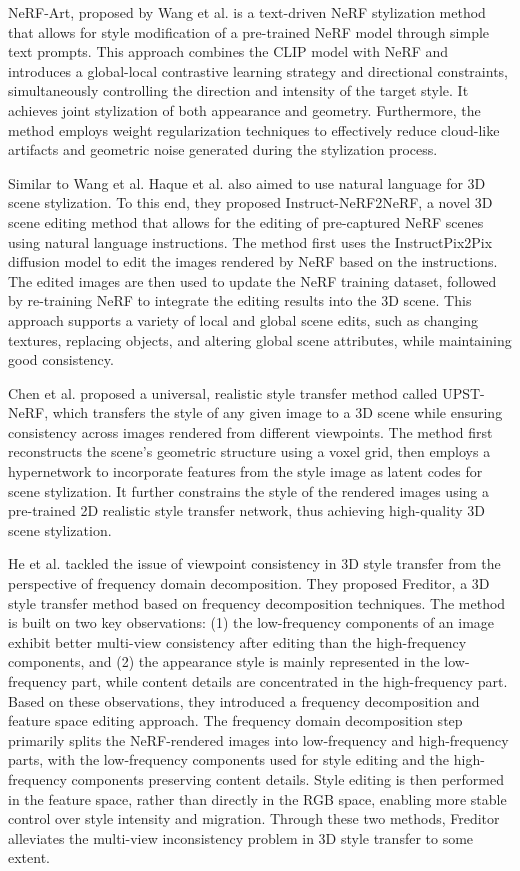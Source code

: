\documentclass[preprint,12pt]{elsarticle}
\begin{document}
NeRF-Art, proposed by Wang et al.\citep{94wang2023nerf}  is a text-driven NeRF stylization method that allows for style modification of a pre-trained NeRF model through simple text prompts. This approach combines the CLIP model with NeRF and introduces a global-local contrastive learning strategy and directional constraints, simultaneously controlling the direction and intensity of the target style. It achieves joint stylization of both appearance and geometry. Furthermore, the method employs weight regularization techniques to effectively reduce cloud-like artifacts and geometric noise generated during the stylization process.

Similar to Wang et al.\citep{94wang2023nerf}  Haque et al.\citep{95haque2023instruct} also aimed to use natural language for 3D scene stylization. To this end, they proposed Instruct-NeRF2NeRF, a novel 3D scene editing method that allows for the editing of pre-captured NeRF scenes using natural language instructions. The method first uses the InstructPix2Pix diffusion model to edit the images rendered by NeRF based on the instructions. The edited images are then used to update the NeRF training dataset, followed by re-training NeRF to integrate the editing results into the 3D scene. This approach supports a variety of local and global scene edits, such as changing textures, replacing objects, and altering global scene attributes, while maintaining good consistency.

Chen et al.\citep{92chen2024upst} proposed a universal, realistic style transfer method called UPST-NeRF, which transfers the style of any given image to a 3D scene while ensuring consistency across images rendered from different viewpoints. The method first reconstructs the scene's geometric structure using a voxel grid, then employs a hypernetwork to incorporate features from the style image as latent codes for scene stylization. It further constrains the style of the rendered images using a pre-trained 2D realistic style transfer network, thus achieving high-quality 3D scene stylization.

He et al.\citep{111he2025freditor} tackled the issue of viewpoint consistency in 3D style transfer from the perspective of frequency domain decomposition. They proposed Freditor, a 3D style transfer method based on frequency decomposition techniques. The method is built on two key observations: (1) the low-frequency components of an image exhibit better multi-view consistency after editing than the high-frequency components, and (2) the appearance style is mainly represented in the low-frequency part, while content details are concentrated in the high-frequency part. Based on these observations, they introduced a frequency decomposition and feature space editing approach. The frequency domain decomposition step primarily splits the NeRF-rendered images into low-frequency and high-frequency parts, with the low-frequency components used for style editing and the high-frequency components preserving content details. Style editing is then performed in the feature space, rather than directly in the RGB space, enabling more stable control over style intensity and migration. Through these two methods, Freditor alleviates the multi-view inconsistency problem in 3D style transfer to some extent.
\end{document}
